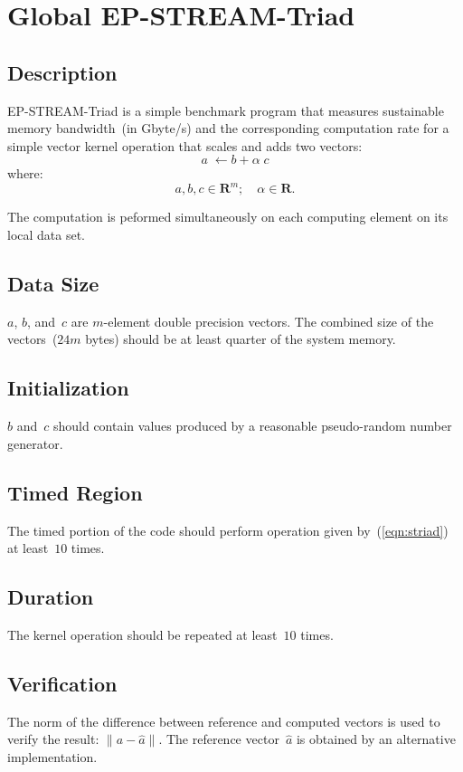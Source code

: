 \documentclass[twocolumn,draft]{article}
\newcommand{\STREAM}{\textsf{STREAM}\xspace}
\begin{document}
\section{Global EP-\STREAM{}-Triad}
\subsection{Description}
EP-\STREAM{}-Triad is a simple benchmark program that measures sustainable
memory bandwidth~(in Gbyte/s) and the corresponding computation rate for
a simple vector kernel operation that scales and adds two vectors:
\begin{equation}
a\;\leftarrow b+\alpha\;c
\label{eqn:striad}
\end{equation}
where:
\[a, b, c\in\mathbf{R}^m; \quad \alpha\in\mathbf{R}.\]

The computation is peformed simultaneously on each computing element on its
local data set.

\subsection{Data Size}
$a$, $b$, and~$c$ are $m$-element double precision vectors. The combined size
of the vectors~($24m$ bytes) should be at least quarter of the system memory.

\subsection{Initialization}
$b$ and~$c$ should contain values produced by a reasonable pseudo-random number
generator.

\subsection{Timed Region}
The timed portion of the code should perform operation given
by~(\ref{eqn:striad}) at least~$10$ times.

\subsection{Duration}
The kernel operation should be repeated at least~$10$ times.

\subsection{Verification}
The norm of the difference between reference and computed vectors is used to
verify the result: $\|a-\hat{a}\|$. The reference vector~$\hat{a}$ is obtained
by an alternative implementation.
\end{document}
